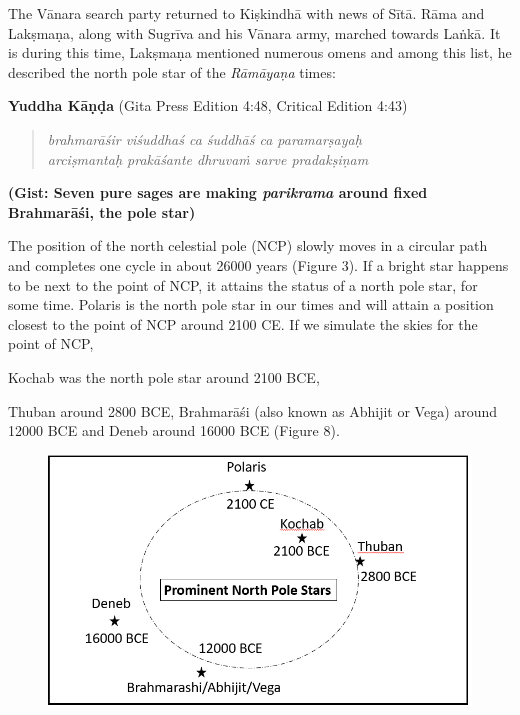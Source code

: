 The Vānara search party returned to Kiṣkindhā with news of Sītā. Rāma and Lakṣmaṇa, along with Sugrīva and his Vānara army, marched towards Laṅkā. It is during this time, Lakṣmaṇa mentioned numerous omens and among this list, he described the north pole star of the \textit{Rāmāyaṇa} times:

\textbf{Yuddha Kāṇḍa} (Gita Press Edition 4:48, Critical Edition 4:43)

\begin{verse}
\textit{brahmarāśir viśuddhaś ca śuddhāś ca paramarṣayaḥ }\\\textit{arciṣmantaḥ prakāśante dhruvaṁ sarve pradakṣiṇam }
\end{verse}

\textbf{(Gist: Seven pure sages are making \textit{parikrama} around fixed Brahmarāśi, the pole star)}

The position of the north celestial pole (NCP) slowly moves in a circular path and completes one cycle in about 26000 years (Figure 3). If a bright star happens to be next to the point of NCP, it attains the status of a north pole star, for some time. Polaris is the north pole star in our times and will attain a position closest to the point of NCP around 2100 CE. If we simulate the skies for the point of NCP,

Kochab was the north pole star around 2100 BCE,

Thuban around 2800 BCE, Brahmarāśi (also known as Abhijit or Vega) around 12000 BCE and Deneb around 16000 BCE (Figure 8).

\begin{figure}[!h]
\includegraphics[scale=.32]{images/chap2-10.jpg}
\caption{}\label{chap1-fig8}
\end{figure}

